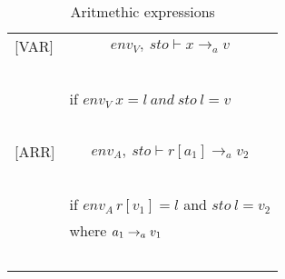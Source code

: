 \begin{table}
\begin{tabular}{l l}
[VAR] & \[env_V, \: sto \vdash x \rightarrow_a v\] \\
~ & ~ \\
~ & \indent\indent if $env_V \: x=l \: and \: sto \: l = v$ \\ 
~ & ~ \\

[ARR] & \[env_A, \: sto \vdash r[a_{1}] \rightarrow_a v_2\] \\
~ & ~ \\
~ & \indent\indent if $env_A \, r[v_{1}]=l$ and $sto \: l=v_2$ \\
~ & \indent\indent where $a_1 \rightarrow_a v_1$ \\
~ & ~ \\

\end{tabular}
\caption{Aritmethic expressions}
\end{table}

